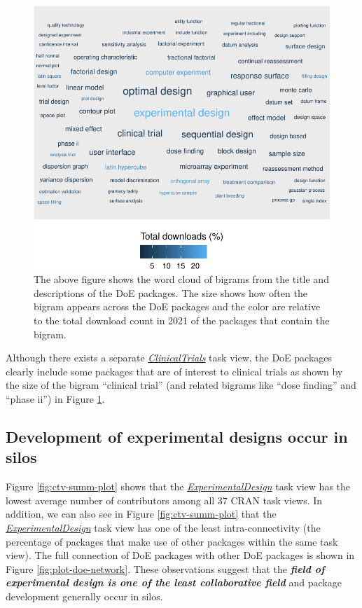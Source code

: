 \documentclass{article}
\begin{document}
\begin{figure}[htbp]

{\centering \includegraphics{figures/wordcloud-over-time-1} 

}

\caption{The above figure shows the word cloud of bigrams from the title and descriptions of the DoE packages. The size shows how often the bigram appears across the DoE packages and the color are relative to the total download count in 2021 of the packages that contain the bigram.}\label{fig:wordcloud-over-time}
\end{figure}

Although there exists a separate
\href{http://CRAN.R-project.org/view=ClinicalTrials}{\emph{ClinicalTrials}}
task view, the DoE packages clearly include some packages that are of
interest to clinical trials as shown by the size of the bigram
``clinical trial'' (and related bigrams like ``dose finding'' and
``phase ii'') in Figure \ref{fig:wordcloud-over-time}.

\hypertarget{silo}{%
\subsection{Development of experimental designs occur in
silos}\label{silo}}

Figure \ref{fig:ctv-summ-plot} shows that the
\href{http://CRAN.R-project.org/view=ExperimentalDesign}{\emph{ExperimentalDesign}}
task view has the lowest average number of contributors among all 37
CRAN task views. In addition, we can also see in Figure
\ref{fig:ctv-summ-plot} that the
\href{http://CRAN.R-project.org/view=ExperimentalDesign}{\emph{ExperimentalDesign}}
task view has one of the least intra-connectivity (the percentage of
packages that make use of other packages within the same task view). The
full connection of DoE packages with other DoE packages is shown in
Figure \ref{fig:plot-doe-network}. These observations suggest that the
\textbf{\emph{field of experimental design is one of the least
collaborative field}} and package development generally occur in silos.
\end{document}
